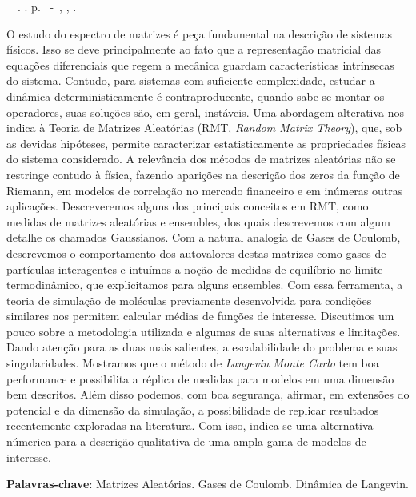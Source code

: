 \setlength{\absparsep}{18pt} %
\begin{resumo}
	\begin{flushleft} 
			\setlength{\absparsep}{0pt} %
			\SingleSpacing 
			\imprimirautorabr~~\textbf{\imprimirtituloresumo}.	\imprimirdata. \pageref{LastPage}p. 
			\imprimirtipotrabalho~-~\imprimirinstituicao, \imprimirlocal, \imprimirdata. 
 	\end{flushleft}
\OnehalfSpacing 	
		
		
O estudo do espectro de matrizes é peça fundamental na descrição de sistemas físicos. Isso se deve principalmente ao fato que a representação matricial das equações diferenciais que regem a mecânica guardam características intrínsecas do sistema. Contudo, para sistemas com suficiente complexidade, estudar a dinâmica deterministicamente é contraproducente, quando sabe-se montar os operadores, suas soluções são, em geral, instáveis. Uma abordagem alterativa nos indica à Teoria de Matrizes Aleatórias (RMT, \textit{Random Matrix Theory}), que, sob as devidas hipóteses, permite caracterizar estatisticamente as propriedades físicas do sistema considerado. A relevância dos métodos de matrizes aleatórias não se restringe contudo à física, fazendo aparições na descrição dos zeros da função de Riemann, em modelos de correlação no mercado financeiro e em inúmeras outras aplicações. Descreveremos alguns dos principais conceitos em RMT, como medidas de matrizes aleatórias e ensembles, dos quais descrevemos com algum detalhe os chamados Gaussianos. Com a natural analogia de Gases de Coulomb, descrevemos o comportamento dos autovalores destas matrizes como gases de partículas interagentes e intuímos a noção de medidas de equilíbrio no limite termodinâmico, que explicitamos para alguns ensembles. Com essa ferramenta, a teoria de simulação de moléculas previamente desenvolvida para condições similares nos permitem calcular médias de funções de interesse. Discutimos um pouco sobre a metodologia utilizada e algumas de suas alternativas e limitações. Dando atenção para as duas mais salientes, a escalabilidade do problema e suas singularidades. Mostramos que o método de \textit{Langevin Monte Carlo} tem boa performance e possibilita a réplica de medidas para modelos em uma dimensão bem descritos. Além disso podemos, com boa segurança, afirmar, em extensões do potencial e da dimensão da simulação, a possibilidade de replicar resultados recentemente exploradas na literatura. Com isso, indica-se uma alternativa númerica para a descrição qualitativa de uma ampla gama de modelos de interesse.

 \textbf{Palavras-chave}: Matrizes Aleatórias. Gases de Coulomb. Dinâmica de Langevin.
\end{resumo}